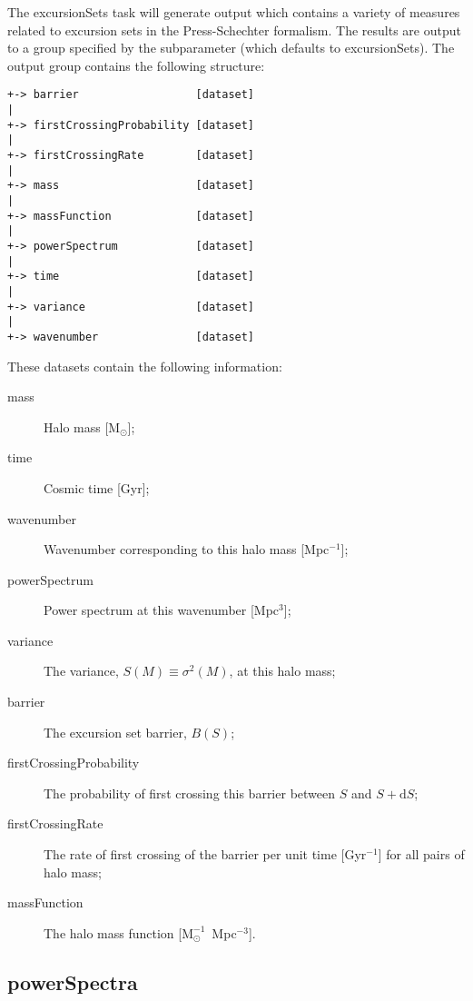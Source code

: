 The {\normalfont \ttfamily excursionSets} task will generate output which contains a variety of measures related to excursion sets in the Press-Schechter formalism. The results are output to a group specified by the {\normalfont \ttfamily [outputGroup]} subparameter (which defaults to {\normalfont \ttfamily excursionSets}). The output group contains the following structure:
\begin{verbatim}
+-> barrier                  [dataset]
|
+-> firstCrossingProbability [dataset]
|
+-> firstCrossingRate        [dataset]
|
+-> mass                     [dataset]
|
+-> massFunction             [dataset]
|
+-> powerSpectrum            [dataset]
|
+-> time                     [dataset]
|
+-> variance                 [dataset]
|
+-> wavenumber               [dataset]
\end{verbatim}
These datasets contain the following information:
\begin{description}
 \item [{\normalfont \ttfamily mass}] Halo mass [$\mathrm{M}_\odot$];
 \item [{\normalfont \ttfamily time}] Cosmic time [Gyr];
 \item [{\normalfont \ttfamily wavenumber}] Wavenumber corresponding to this halo mass [Mpc$^{-1}$];
 \item [{\normalfont \ttfamily powerSpectrum}] Power spectrum at this wavenumber [Mpc$^3$];
 \item [{\normalfont \ttfamily variance}] The variance, $S(M)\equiv\sigma^2(M)$, at this halo mass;
 \item [{\normalfont \ttfamily barrier}] The excursion set barrier, $B(S)$;
 \item [{\normalfont \ttfamily firstCrossingProbability}] The probability of first crossing this barrier between $S$ and $S+\mathrm{d}S$;
 \item [{\normalfont \ttfamily firstCrossingRate}] The rate of first crossing of the barrier per unit time [Gyr$^{-1}$] for all pairs of halo mass;
 \item [{\normalfont \ttfamily massFunction}] The halo mass function [$\mathrm{M}^{-1}_\odot$~Mpc$^{-3}$].
\end{description}

\subsection{{\normalfont \ttfamily powerSpectra}}

